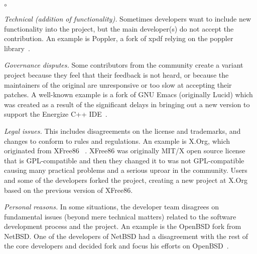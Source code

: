 \begin{list}{$\circ$}{}
   \item \textit{Technical (addition of functionality).} Sometimes developers want to include new functionality into the project, but the main developer(s) do not accept the contribution. An example is \textsf{Poppler}, a fork of \textsf{xpdf} relying on the \textsf{poppler} library~\cite{Gregorio:2012}.

    \item \textit{Governance disputes.} Some contributors from the community create a variant project because they feel that their feedback is not heard, or because the maintainers of the original are unresponsive or too slow at accepting their patches. A well-known example is a fork of \textsf{GNU Emacs} (originally \textsf{Lucid}) which was created as a result of the significant delays in bringing out a new version to support the Energize C++ IDE~\cite{Wheeler:2015Forking}.

\item \textit{Legal issues.} This includes disagreements on the license and trademarks, and changes to conform to rules and regulations. An example is \textsf{X.Org}, which originated from \textsf{XFree86} ~\cite{Gregorio:2012,Wheeler:2015Forking}. \textsf{XFree86} was originally \textsf{MIT/X} open source license that is GPL-compatible and then they changed it to was not  GPL-compatible causing many practical problems and a serious uproar in the community. Users and some of the developers forked the project, creating a new project at \textsf{X.Org} based on the previous version of \textsf{XFree86}.

\item \textit{Personal reasons.} In some situations, the developer team disagrees on fundamental issues (beyond mere technical matters) related to the software development process and the project. An example is the \textsf{OpenBSD} fork from \textsf{NetBSD}. One of the developers of \textsf{NetBSD} had a disagreement with the rest of the core developers and decided fork and focus his efforts on \textsf{OpenBSD}~\cite{theo:openbsd}.


\end{list}

